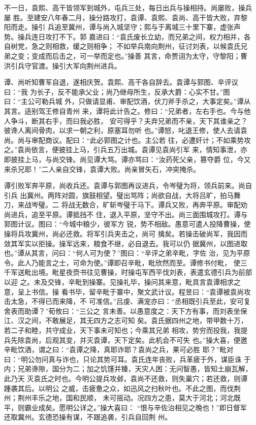 不一日，袁熙、高干皆领军到城外，屯兵三处，每日出兵与操相持。尚屡败，操兵屡
胜。至建安八年春二月，操分路攻打，袁谭、袁熙、袁尚、高干皆大败，弃黎阳而走。操引
兵追至冀州，谭与尚入城坚守；熙与于离城三十里下寨，虚张声势。操兵连日攻打不下。郭
嘉进曰：“袁氏废长立幼，而兄弟之间，权力相并，各自树党，急之则相救，缓之则相争；
不如举兵南向荆州，征讨刘表，以候袁氏兄弟之变；变成而后击之，可一举而定也。”操善
其言，命贾诩为太守，守黎阳；曹洪引兵守官渡。操引大军向荆州进兵。

谭、尚听知曹军自退，遂相庆贺。袁熙、高干各自辞去。袁谭与郭图、辛评议曰：“我
为长子，反不能承父业；尚乃继母所生，反承大爵：心实不甘。”图曰：“主公可勒兵城
外，只做请显甫、审配饮酒，伏刀斧手杀之，大事定矣。”谭从其言。适别驾王修自青州
来，谭将此计告之。修曰：“兄弟者，左右手也。今与他人争斗，断其右手，而曰我必胜，
安可得乎？夫弃兄弟而不亲，天下其谁亲之？彼谗人离间骨肉，以求一朝之利，原塞耳勿听
也。”谭怒，叱退王修，使人去请袁尚。尚与审配商议。配曰：“此必郭图之计也。主公若
往，必遭奸计；不如乘势攻之。”袁尚依言，便披挂上马，引兵五万出城。袁谭见袁尚引军
来，情知事泄，亦即披挂上马，与尚交锋。尚见谭大骂。谭亦骂曰：“汝药死父亲，篡夺爵
位，今又来杀兄耶！”二人亲自交锋，袁谭大败。尚亲冒矢石，冲突掩杀。

谭引败军奔平原，尚收兵还。袁谭与郭图再议进兵，令岑璧为将，领兵前来。尚自引兵
出冀州。两阵对圆，旗鼓相望。璧出骂阵；尚欲自战，大将吕旷，拍马舞刀，来战岑璧。二
将战无数合，旷斩岑璧于马下。谭兵又败，再奔平原。审配劝尚进兵，追至平原。谭抵挡不
住，退入平原，坚守不出。尚三面围城攻打。谭与郭图计议。图曰：“今城中粮少，彼军方
锐，势不相敌。愚意可遣人投降曹操，使操将兵攻冀州，尚必还救。将军引兵夹击之，尚可
擒矣。若操击破尚军，我因而敛其军实以拒操。操军远来，粮食不继，必自退去。我可以仍
据冀州，以图进取也。”谭从其言，问曰：“何人可为使？”图曰：“辛评之弟辛毗，字佐
治，见为平原令。此人乃能言之士，可命为使。”谭即召辛毗，毗欣然而至。谭修书付毗，
使三千军送毗出境。毗星夜赍书往见曹操，时操屯军西平伐刘表，表遣玄德引兵为前部以迎
之。未及交锋，辛毗到操寨。见操礼毕，操问其来意，毗具言袁谭相求之意，呈上书信。操
看书毕，留辛毗于寨中，聚文武计议。程昱曰：“袁谭被袁尚攻击太急，不得已而来降，不
可准信。”吕虔、满宠亦曰：“丞相既引兵至此，安可复舍表而助谭？”荀攸曰：“三公之
言未善。以愚意度之：天下方有事，而刘表坐保江、汉之间，不敢展足，其无四方之志可知
矣。袁氏据四州之地，带甲数十万，若二子和睦，共守成业，天下事未可知也；今乘其兄弟
相攻，势穷而投我，我提兵先除袁尚，后观其变，并灭袁谭，天下定矣。此机会不可失
也。”操大喜，便邀辛毗饮酒，谓之曰：“袁谭之降，真耶诈耶？袁尚之兵，果可必胜
耶？”毗对曰：“明公勿问真与诈也，只论其势可耳。袁氏连年丧败，兵革疲于外，谋臣诛
于内；兄弟谗隙，国分为二；加之饥馑并臻，天灾人困：无问智愚，皆知土崩瓦解，此乃天
灭袁氏之时也。今明公提兵攻邺，袁尚不还救，则失巢穴；若还救，则谭踵袭其后。以明公
之威，击疲惫之众，如迅风之扫秋叶也。不此之图，而伐荆州；荆州丰乐之地，国和民顺，
未可摇动。况四方之患，莫大于河北；河北既平，则霸业成矣。愿明公详之。”操大喜曰：
“恨与辛佐治相见之晚也！”即日督军还取冀州。玄德恐操有谋，不跟追袭，引兵自回荆
州。

